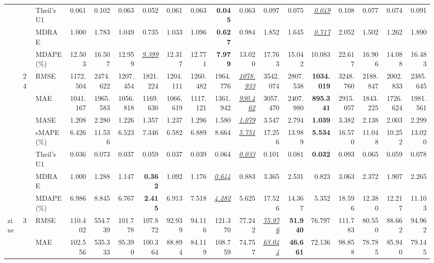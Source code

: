 \begin{table}[!htbp]
{\begin{tabular}{lllrrrrrrrrrrrrrrr}
 &  & Theil's U1 & 0.061 & 0.102 & 0.063 & 0.052 & 0.061 & 0.063 & \textbf{0.045} & 0.063 & 0.097 & 0.075 & \underline{\textit{0.049}} & 0.108 & 0.077 & 0.074 & 0.091 \\
 &  & MDRAE & 1.000 & 1.783 & 1.049 & 0.735 & 1.033 & 1.096 & \textbf{0.627} & 0.984 & 1.852 & 1.645 & \underline{\textit{0.717}} & 2.052 & 1.502 & 1.262 & 1.890 \\
 &  & MDAPE (\%) & 12.503 & 16.507 & 12.959 & \underline{\textit{9.399}} & 12.317 & 12.771 & \textbf{7.979} & 13.020 & 17.763 & 15.042 & 10.083 & 22.617 & 16.906 & 14.088 & 16.483 \\
\cmidrule(lr){2-18}
 & 24 & RMSE & 1172.504 & 2474.622 & 1207.454 & 1821.224 & 1204.111 & 1260.482 & 1964.776 & \underline{\textit{1078.933}} & 3542.074 & 2807.538 & \textbf{1034.019} & 3248.760 & 2188.847 & 2002.833 & 2385.645 \\
 &  & MAE & 1041.167 & 1965.583 & 1056.818 & 1169.630 & 1066.619 & 1117.121 & 1361.942 & \underline{\textit{930.462}} & 3057.470 & 2407.980 & \textbf{895.341} & 2915.057 & 1843.225 & 1726.624 & 1981.561 \\
 &  & MASE & 1.208 & 2.280 & 1.226 & 1.357 & 1.237 & 1.296 & 1.580 & \underline{\textit{1.079}} & 3.547 & 2.794 & \textbf{1.039} & 3.382 & 2.138 & 2.003 & 2.299 \\
 &  & sMAPE (\%) & 6.426 & 11.536 & 6.523 & 7.346 & 6.582 & 6.889 & 8.664 & \underline{\textit{5.751}} & 17.256 & 13.989 & \textbf{5.534} & 16.570 & 11.048 & 10.252 & 13.020 \\
 &  & Theil's U1 & 0.036 & 0.073 & 0.037 & 0.059 & 0.037 & 0.039 & 0.064 & \underline{\textit{0.033}} & 0.101 & 0.081 & \textbf{0.032} & 0.093 & 0.065 & 0.059 & 0.078 \\
 &  & MDRAE & 1.000 & 1.288 & 1.147 & \textbf{0.362} & 1.092 & 1.176 & \underline{\textit{0.644}} & 0.883 & 3.365 & 2.531 & 0.823 & 3.063 & 2.372 & 1.907 & 2.265 \\
 &  & MDAPE (\%) & 6.986 & 8.845 & 6.767 & \textbf{2.415} & 6.913 & 7.518 & \underline{\textit{4.282}} & 5.625 & 17.526 & 14.367 & 5.352 & 18.596 & 12.380 & 12.217 & 11.103 \\
\midrule
zinc & 3 & RMSE & 110.402 & 554.739 & 101.778 & 107.872 & 92.939 & 94.116 & 121.370 & 77.242 & \underline{\textit{75.976}} & \textbf{51.940} & 76.797 & 111.783 & 80.550 & 88.662 & 94.962 \\
 &  & MAE & 102.556 & 535.333 & 95.390 & 100.364 & 88.894 & 84.119 & 108.759 & 74.757 & \underline{\textit{63.044}} & \textbf{46.661} & 72.136 & 98.858 & 78.785 & 85.940 & 79.145 \\

\end{tabular}}
\end{table}
